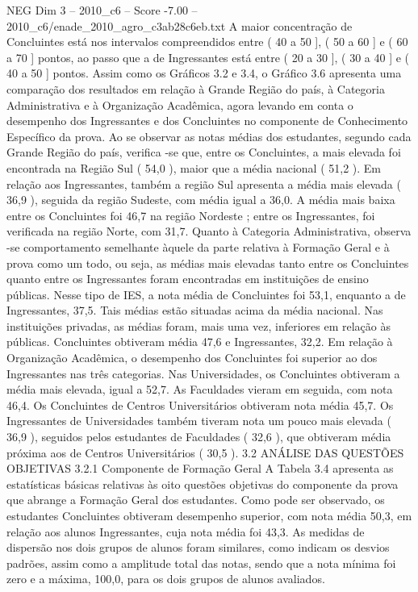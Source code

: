 \begin{textsample}{NEG Dim 3 – 2010\_c6 – Score -7.00 – 2010\_c6/enade\_2010\_agro\_c3ab28c6eb.txt}
A maior concentração de Concluintes está nos intervalos compreendidos entre ( 40 a 50 ], ( 50 a 60 ] e ( 60 a 70 ] pontos, ao passo que a de Ingressantes está entre ( 20 a 30 ], ( 30 a 40 ] e ( 40 a 50 ] pontos.
Assim como os Gráficos 3.2 e 3.4, o Gráfico 3.6 apresenta uma comparação dos resultados em relação à Grande Região do país, à Categoria Administrativa e à Organização Acadêmica, agora levando em conta o desempenho dos Ingressantes e dos Concluintes no componente de Conhecimento Específico da prova.
Ao se observar as notas médias dos estudantes, segundo cada Grande Região do país, verifica -se que, entre os Concluintes, a mais elevada foi encontrada na Região Sul ( 54,0 ), maior que a média nacional ( 51,2 ).
Em relação aos Ingressantes, também a região Sul apresenta a média mais elevada ( 36,9 ), seguida da região Sudeste, com média igual a 36,0.
A média mais baixa entre os Concluintes foi 46,7 na região Nordeste ; entre os Ingressantes, foi verificada na região Norte, com 31,7.
Quanto à Categoria Administrativa, observa -se comportamento semelhante àquele da parte relativa à Formação Geral e à prova como um todo, ou seja, as médias mais elevadas tanto entre os Concluintes quanto entre os Ingressantes foram encontradas em instituições de ensino públicas.
Nesse tipo de IES, a nota média de Concluintes foi 53,1, enquanto a de Ingressantes, 37,5.
Tais médias estão situadas acima da média nacional.
Nas instituições privadas, as médias foram, mais uma vez, inferiores em relação às públicas.
Concluintes obtiveram média 47,6 e Ingressantes, 32,2.
Em relação à Organização Acadêmica, o desempenho dos Concluintes foi superior ao dos Ingressantes nas três categorias.
Nas Universidades, os Concluintes obtiveram a média mais elevada, igual a 52,7.
As Faculdades vieram em seguida, com nota 46,4.
Os Concluintes de Centros Universitários obtiveram nota média 45,7.
Os Ingressantes de Universidades também tiveram nota um pouco mais elevada ( 36,9 ), seguidos pelos estudantes de Faculdades ( 32,6 ), que obtiveram média próxima aos de Centros Universitários ( 30,5 ). 3.2 ANÁLISE DAS QUESTÕES OBJETIVAS 3.2.1 Componente de Formação Geral A Tabela 3.4 apresenta as estatísticas básicas relativas às oito questões objetivas do componente da prova que abrange a Formação Geral dos estudantes.
Como pode ser observado, os estudantes Concluintes obtiveram desempenho superior, com nota média 50,3, em relação aos alunos Ingressantes, cuja nota média foi 43,3.
As medidas de dispersão nos dois grupos de alunos foram similares, como indicam os desvios padrões, assim como a amplitude total das notas, sendo que a nota mínima foi zero e a máxima, 100,0, para os dois grupos de alunos avaliados.

\end{textsample}
